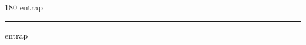 
\begin{frame}
\begin{center}
\begin{turn}{180}
{\fontsize{2.5cm}{1em}\selectfont entrap}
\end{turn}
\vspace{1em}\par  
\hrule
\vspace{1em}\par  
{\fontsize{2.5cm}{1em}\selectfont entrap}
\end{center}
\end{frame}
